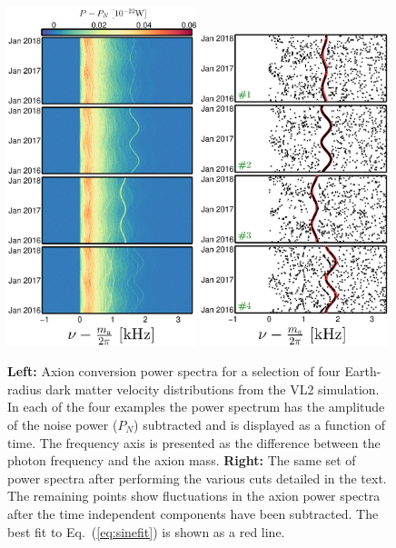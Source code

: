 \begin{figure}
\begin{center}
	\includegraphics[width=0.49\textwidth]{Figures/vl2_powerspectra.eps}
	\includegraphics[width=0.49\textwidth]{Figures/vl2_reduced.eps}
    \caption[VL2 axion conversion power spectra]{{\bf Left:} Axion conversion power spectra for a selection of four Earth-radius dark matter velocity distributions from the VL2 simulation. In each of the four examples the power spectrum has the amplitude of the noise power ($P_N$) subtracted and is displayed as a function of time. The frequency axis is presented as the difference between the photon frequency and the axion mass. {\bf Right:} The same set of power spectra after performing the various cuts detailed in the text. The remaining points show fluctuations in the axion power spectra after the time independent components have been subtracted. The best fit to Eq.~(\ref{eq:sinefit}) is shown as a red line.}\label{fig:vl2_powerspectra}
\end{center}
\end{figure}
